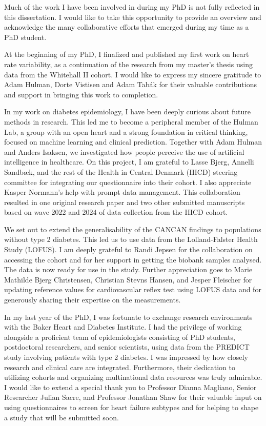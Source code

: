 \documentclass[
  a4paper,
  headsepline=true,
  open=left]{scrbook}
\begin{document}

Much of the work I have been involved in during my PhD is not fully
reflected in this dissertation. I would like to take this opportunity to
provide an overview and acknowledge the many collaborative efforts that
emerged during my time as a PhD student.

At the beginning of my PhD, I finalized and published my first work on
heart rate variability, as a continuation of the research from my
master's thesis using data from the Whitehall II cohort. I would like to
express my sincere gratitude to Adam Hulman, Dorte Vistisen and Adam
Tabák for their valuable contributions and support in bringing this work
to completion.

In my work on diabetes epidemiology, I have been deeply curious about
future methods in research. This led me to become a peripheral member of
the Hulman Lab, a group with an open heart and a strong foundation in
critical thinking, focused on machine learning and clinical prediction.
Together with Adam Hulman and Anders Isaksen, we investigated how people
perceive the use of artificial intelligence in healthcare. On this
project, I am grateful to Lasse Bjerg, Annelli Sandbæk, and the rest of
the Health in Central Denmark (HICD) steering committee for integrating
our questionnaire into their cohort. I also appreciate Kasper Normann's
help with prompt data management. This collaboration resulted in one
original research paper and two other submitted manuscripts based on
wave 2022 and 2024 of data collection from the HICD cohort.

We set out to extend the generalisability of the CANCAN findings to
populations without type 2 diabetes. This led us to use data from the
Lolland-Falster Health Study (LOFUS). I am deeply grateful to Randi
Jepsen for the collaboration on accessing the cohort and for her support
in getting the biobank samples analysed. The data is now ready for use
in the study. Further appreciation goes to Marie Mathilde Bjerg
Christensen, Christian Stevns Hansen, and Jesper Fleischer for updating
reference values for cardiovascular reflex test using LOFUS data and for
generously sharing their expertise on the measurements.

In my last year of the PhD, I was fortunate to exchange research
environments with the Baker Heart and Diabetes Institute. I had the
privilege of working alongside a proficient team of epidemiologists
consisting of PhD students, postdoctoral researchers, and senior
scientists, using data from the PREDICT study involving patients with
type 2 diabetes. I was impressed by how closely research and clinical
care are integrated. Furthermore, their dedication to utilizing cohorts
and organizing multinational data resources was truly admirable. I would
like to extend a special thank you to Professor Dianna Magliano, Senior
Researcher Julian Sacre, and Professor Jonathan Shaw for their valuable
input on using questionnaires to screen for heart failure subtypes and
for helping to shape a study that will be submitted soon.
\end{document}
